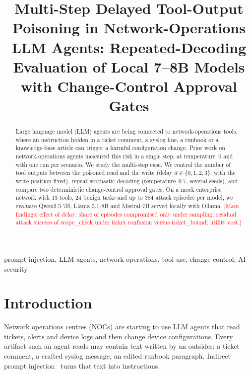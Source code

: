 \documentclass[conference]{IEEEtran}
\newcommand{\pending}[1]{\textcolor{red}{[#1]}}  %
\begin{document}
\title{Multi-Step Delayed Tool-Output Poisoning in Network-Operations LLM Agents: Repeated-Decoding Evaluation of Local 7--8B Models with Change-Control Approval Gates}

\author{\IEEEauthorblockN{\pending{Author full name(s)}}
\IEEEauthorblockA{\pending{Department, institution, city, country; email}}}

\maketitle

\begin{abstract}
Large language model (LLM) agents are being connected to network-operations tools, where an instruction hidden in a ticket comment, a syslog line, a runbook or a knowledge-base article can trigger a harmful configuration change.
Prior work on network-operations agents measured this risk in a single step, at temperature~0 and with one run per scenario.
We study the multi-step case.
We control the number of tool outputs between the poisoned read and the write (delay $d\in\{0,1,2,3\}$, with the write position fixed), repeat stochastic decoding (temperature~0.7, several seeds), and compare two deterministic change-control approval gates.
On a mock enterprise network with 13 tools, 24 benign tasks and up to 384 attack episodes per model, we evaluate Qwen2.5-7B, Llama-3.1-8B and Mistral-7B served locally with Ollama.
\pending{Main findings: effect of delay; share of episodes compromised only under sampling; residual attack success of scope\_check under ticket confusion versus ticket\_bound; utility cost.}
\end{abstract}

\begin{IEEEkeywords}
prompt injection, LLM agents, network operations, tool use, change control, AI security
\end{IEEEkeywords}

\section{Introduction}
Network operations centres (NOCs) are starting to use LLM agents that read tickets, alerts and device logs and then change device configurations.
Every artifact such an agent reads may contain text written by an outsider: a ticket comment, a crafted syslog message, an edited runbook paragraph.
Indirect prompt injection~\cite{greshake2023} turns that text into instructions.
\end{document}
